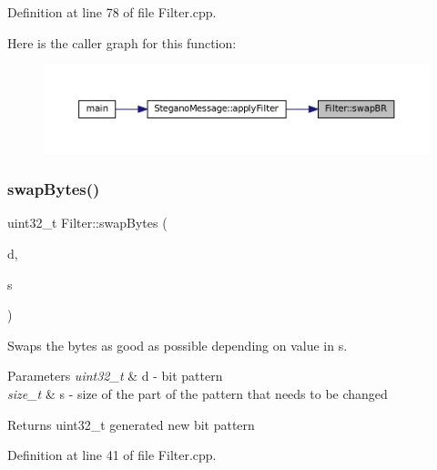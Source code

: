 Definition at line 78 of file Filter.\+cpp.

Here is the caller graph for this function\+:\nopagebreak
\begin{figure}[H]
\begin{center}
\leavevmode
\includegraphics[width=350pt]{classFilter_a51a2b1cce4671083d47530694d0e797e_icgraph}
\end{center}
\end{figure}
\mbox{\label{classFilter_a9d4f7bd12f0bfdf200abf53d166fd944}} 
\subsubsection{\texorpdfstring{swapBytes()}{swapBytes()}}
{\footnotesize\ttfamily uint32\+\_\+t Filter\+::swap\+Bytes (\begin{DoxyParamCaption}\item[{uint32\+\_\+t}]{d,  }\item[{size\+\_\+t}]{s }\end{DoxyParamCaption})\hspace{0.3cm}{\ttfamily [static]}}



Swaps the bytes as good as possible depending on value in s. 


\begin{DoxyParams}{Parameters}
{\em uint32\+\_\+t} & d -\/ bit pattern \\
\hline
{\em size\+\_\+t} & s -\/ size of the part of the pattern that needs to be changed \\
\hline
\end{DoxyParams}
\begin{DoxyReturn}{Returns}
uint32\+\_\+t generated new bit pattern 
\end{DoxyReturn}


Definition at line 41 of file Filter.\+cpp.

